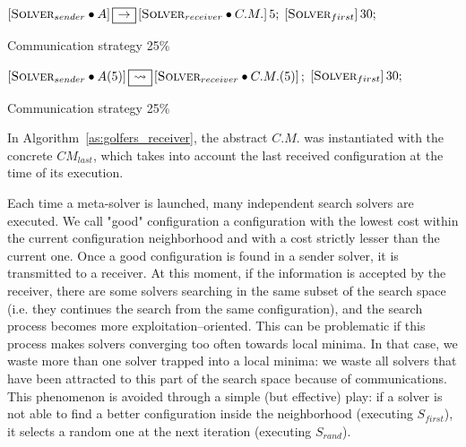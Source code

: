 \begin{algorithm}
\dontprintsemicolon
\SetNoline
$\left[\eqsolverposl{sender}\posldot A\right] \onetoone \left[\eqsolverposl{receiver}\posldot C.M.\right]5;$\;
$\left[\textbf{{\sc Solver}}_{first}\right]30;$
\caption{Communication strategy \oneTone{} 25\%}\label{comm:golfers_1_1-1_25}
\end{algorithm}

\begin{algorithm}
\dontprintsemicolon
\SetNoline
$\left[\eqsolverposl{sender}\posldot A(5)\right] \oneton \left[\eqsolverposl{receiver}\posldot C.M.(5)\right];$\;
$\left[\textbf{{\sc Solver}}_{first}\right]30;$
\caption{Communication strategy \oneTn{} 25\%}\label{comm:golfers_1_1-n_25}
\end{algorithm}

In Algorithm~\ref{as:golfers_receiver}, the abstract \opch{} $C.M.$ was instantiated with the concrete \opch{} $CM_{last}$, which takes into account the last received configuration at the time of its execution.

Each time a \posl{} meta-solver is launched, many independent search solvers are executed. We call "good" configuration a configuration with the lowest cost within the current configuration neighborhood and with a cost strictly lesser than the current one. Once a good configuration is found in a sender solver, it is transmitted to a receiver. At this moment, if the information is accepted by the receiver, there are some solvers searching in the same subset of the search space (i.e. they continues the search from the same configuration), and the search process becomes more exploitation--oriented. This can be problematic if this process makes solvers converging too often towards local minima. In that case, we waste more than one solver trapped into a local minima: we waste all solvers that have been attracted to this part of the search space because of communications. This phenomenon is avoided through a simple (but effective) play: if a solver is not able to find a better configuration inside the neighborhood (executing $S_{first}$), it selects a random one at the next iteration (executing $S_{rand}$).

